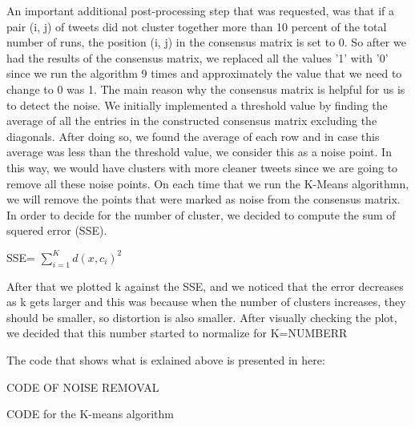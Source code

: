 \documentclass{article}
\begin{document}
An important additional post-processing step that was requested, was that if a pair (i, j) of tweets did not cluster together more than 10 percent of the total number of runs, the position (i, j) in the consensus matrix is set to 0. So after we had the results of the consensus matrix, we replaced all the values '1' with '0' since we run the algorithm 9 times and approximately the value that we need to change to 0 was 1. 
The main reason why the consensus matrix is helpful for us is to detect the noise. We initially implemented a threshold value by finding the average of all the entries in the constructed consensus matrix excluding the diagonals. After doing so, we found the average of each row and in case this average was less than the threshold value, we consider this as a noise point. In this way, we would have clusters with more cleaner tweets since we are going to remove all these noise points. On each time that we run the K-Means algorithmn, we will remove the points that were marked as noise from the consensus matrix. 
In order to decide for the number of cluster, we decided to compute the sum of squered error (SSE). 

SSE= $\sum\limits_{i=1}^K d(x,c_{i})^2 $

After that we plotted k against the SSE, and we noticed that the error decreases as k gets larger and this was because when the number of clusters increases, they should be smaller, so distortion is also smaller. After visually checking the plot, we decided that this number started to normalize for K=NUMBERR





The code that shows what is exlained above is presented in here: 

CODE OF NOISE REMOVAL



CODE for the K-means algorithm
\end{document}
